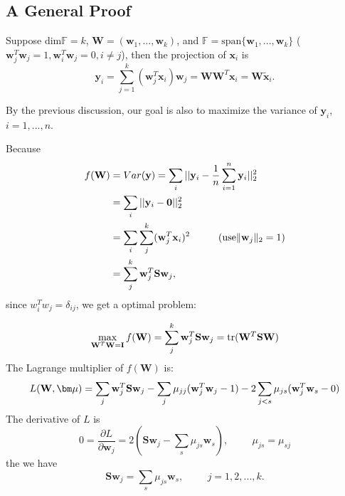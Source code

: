 \subsection{A General Proof}
	Suppose $\text{dim}\mathbb F = k$,  $\mathbf{W}=(\mathbf{w}_1,...,\mathbf{w}_k)$, and $\mathbb F=\text{span}\{\mathbf{w}_1,...,\mathbf{w}_k\}$ ($\mathbf{w}_j^T\mathbf{w}_j=1,\mathbf{w}_i^T\mathbf{w}_j=0, i\neq j$), then the projection of $\mathbf x_i$ is
	\begin{equation}
		\mathbf{y}_i=\sum_{j=1}^{k}(\mathbf{w}_j^T \mathbf{x}_i)\mathbf{w}_j=\mathbf W\mathbf W^T\mathbf x_i=\mathbf W \tilde{\mathbf x}_i.
	\end{equation}
	
	By the previous discussion, our goal is also to maximize the variance of $\mathbf y_i$, $i=1,...,n$.
	
	Because
	\begin{align*}
	f(\textbf W)
	&=Var(\textbf y) = \sum_i \mathbf ||\mathbf y_i-\dfrac{1}{n}\sum_{i=1}^{n}\mathbf y_i||_2^2\\
	&= \sum_i \mathbf ||\mathbf y_i-\mathbf 0||_2^2\\
	&= \sum_i\sum_j^k(\textbf w_j^T \textbf x_i)^2 \hspace{1cm} (\text{use} \|\mathbf w_j\|_2=1)\\
	&=\sum_j^k\textbf w_j^T \mathbf{S} \textbf w_j, \\
	\end{align*}
	since $w_i^T w_j=\delta_{ij}$, we get a optimal problem:
	
	\begin{equation}
	\max_{\mathbf W^T\mathbf W=\mathbf I}f(\mathbf W)=\sum_j^k\textbf w_j^T \mathbf{S} \textbf w_j= \text{tr}(\mathbf W^T\mathbf S\mathbf W)
	\end{equation}
	The Lagrange multiplier of $f(\mathbf W)$ is: 
	\begin{equation}
	L(\textbf W,\bm \mu)
	=\sum_j\textbf w_j^T \mathbf{S} \textbf w_j-\sum_j\mu_{jj}(\textbf w_j^T \textbf w_j-1)-2\sum_{j< s} \mu_{js}(\textbf w_j^T \textbf w_s-0)
	\end{equation}
	The derivative of $L$ is
	\begin{equation}
	0=\dfrac{\partial L}{\partial \mathbf w_j}=2(\mathbf{S}\mathbf w_j-\sum_s \mu_{js}  \mathbf w_s), \hspace{1cm} \mu_{js}=\mu_{sj}
	\end{equation}
	the we have
	\begin{equation}
	\mathbf{S}\mathbf w_j=\sum_s \mu_{js}  \mathbf w_s,\hspace{1cm} j=1,2,...,k.
	\end{equation}
	
